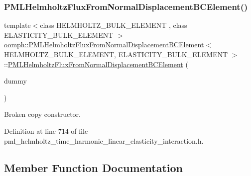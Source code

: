 \subsubsection{\texorpdfstring{P\+M\+L\+Helmholtz\+Flux\+From\+Normal\+Displacement\+B\+C\+Element()}{PMLHelmholtzFluxFromNormalDisplacementBCElement()}\hspace{0.1cm}{\footnotesize\ttfamily [2/2]}}
{\footnotesize\ttfamily template$<$class H\+E\+L\+M\+H\+O\+L\+T\+Z\+\_\+\+B\+U\+L\+K\+\_\+\+E\+L\+E\+M\+E\+NT , class E\+L\+A\+S\+T\+I\+C\+I\+T\+Y\+\_\+\+B\+U\+L\+K\+\_\+\+E\+L\+E\+M\+E\+NT $>$ \\
\hyperlink{classoomph_1_1PMLHelmholtzFluxFromNormalDisplacementBCElement}{oomph\+::\+P\+M\+L\+Helmholtz\+Flux\+From\+Normal\+Displacement\+B\+C\+Element}$<$ H\+E\+L\+M\+H\+O\+L\+T\+Z\+\_\+\+B\+U\+L\+K\+\_\+\+E\+L\+E\+M\+E\+NT, E\+L\+A\+S\+T\+I\+C\+I\+T\+Y\+\_\+\+B\+U\+L\+K\+\_\+\+E\+L\+E\+M\+E\+NT $>$\+::\hyperlink{classoomph_1_1PMLHelmholtzFluxFromNormalDisplacementBCElement}{P\+M\+L\+Helmholtz\+Flux\+From\+Normal\+Displacement\+B\+C\+Element} (\begin{DoxyParamCaption}\item[{const \hyperlink{classoomph_1_1PMLHelmholtzFluxFromNormalDisplacementBCElement}{P\+M\+L\+Helmholtz\+Flux\+From\+Normal\+Displacement\+B\+C\+Element}$<$ H\+E\+L\+M\+H\+O\+L\+T\+Z\+\_\+\+B\+U\+L\+K\+\_\+\+E\+L\+E\+M\+E\+NT, E\+L\+A\+S\+T\+I\+C\+I\+T\+Y\+\_\+\+B\+U\+L\+K\+\_\+\+E\+L\+E\+M\+E\+NT $>$ \&}]{dummy }\end{DoxyParamCaption})\hspace{0.3cm}{\ttfamily [inline]}}



Broken copy constructor. 



Definition at line 714 of file pml\+\_\+helmholtz\+\_\+time\+\_\+harmonic\+\_\+linear\+\_\+elasticity\+\_\+interaction.\+h.



\subsection{Member Function Documentation}
\mbox{\label{classoomph_1_1PMLHelmholtzFluxFromNormalDisplacementBCElement_a159c7c508fc565f7d70481cd467a5152}} 
